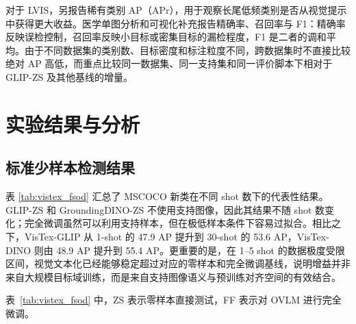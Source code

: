 对于 LVIS，另报告稀有类别 AP（APr），用于观察长尾低频类别是否从视觉提示中获得更大收益\cite{gupta2019lvis}。医学单图分析和可视化补充报告精确率、召回率与 F1：精确率反映误检控制，召回率反映小目标或密集目标的漏检程度，F1 是二者的调和平均。由于不同数据集的类别数、目标密度和标注粒度不同，跨数据集时不直接比较绝对 AP 高低，而重点比较同一数据集、同一支持集和同一评价脚本下相对于 GLIP-ZS 及其他基线的增量。

\section{实验结果与分析}
\subsection{标准少样本检测结果}
表 \ref{tab:vistex_fsod} 汇总了 MSCOCO 新类在不同 shot 数下的代表性结果。GLIP-ZS 和 GroundingDINO-ZS 不使用支持图像，因此其结果不随 shot 数变化；完全微调虽然可以利用支持样本，但在极低样本条件下容易过拟合。相比之下，VisTex-GLIP 从 1-shot 的 47.9 AP 提升到 30-shot 的 53.6 AP，VisTex-DINO 则由 48.9 AP 提升到 55.4 AP。更重要的是，在 1--5 shot 的数据极度受限区间，视觉文本化已经能够稳定超过对应的零样本和完全微调基线，说明增益并非来自大规模目标域训练，而是来自支持图像语义与预训练对齐空间的有效结合。

\begin{table}[t]
  \centering
  \caption{MSCOCO 新类少样本检测结果}
  \label{tab:vistex_fsod}
\end{table}
表~\ref{tab:vistex_fsod} 中，ZS 表示零样本直接测试，FF 表示对 OVLM 进行完全微调。


